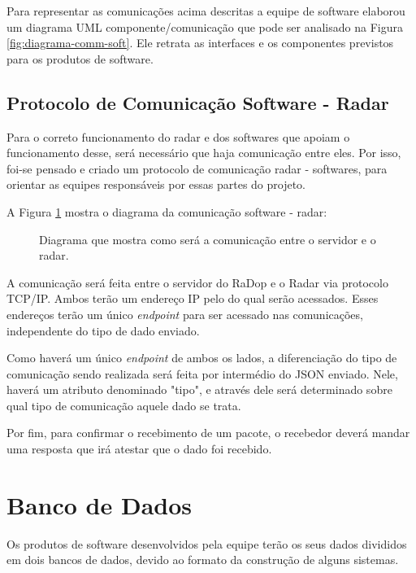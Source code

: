 Para representar as comunicações acima descritas a equipe de software elaborou um diagrama UML componente/comunicação que pode ser analisado na Figura \ref{fig:diagrama-comm-soft}. Ele retrata as interfaces e os componentes previstos para os produtos de software.

\subsection{Protocolo de Comunicação Software - Radar}

Para o correto funcionamento do radar e dos softwares que apoiam o funcionamento desse, será necessário que haja comunicação entre eles. Por isso, foi-se pensado e criado um protocolo de comunicação radar - softwares, para orientar as equipes responsáveis por essas partes do projeto.

A Figura \ref{fig:diagrama-com-soft-radar} mostra o diagrama da comunicação software - radar:

\begin{figure}[ht]
	\caption{\label{fig:diagrama-com-soft-radar} Diagrama que mostra como será a comunicação entre o servidor e o radar.}
\end{figure}

A comunicação será feita entre o servidor do RaDop e o Radar via protocolo TCP/IP. Ambos terão um endereço IP pelo do qual serão acessados. Esses endereços terão um único \textit{endpoint} para ser acessado nas comunicações, independente do tipo de dado enviado.

Como haverá um único \textit{endpoint} de ambos os lados, a diferenciação do tipo de comunicação sendo realizada será feita por intermédio do JSON enviado. Nele, haverá um atributo denominado "tipo", e através dele será determinado sobre qual tipo de comunicação aquele dado se trata.

Por fim, para confirmar o recebimento de um pacote, o recebedor deverá mandar uma resposta que irá atestar que o dado foi recebido.

\section{Banco de Dados}

Os produtos de software desenvolvidos pela equipe terão os seus dados divididos em dois bancos de dados, devido ao formato da construção de alguns sistemas.


